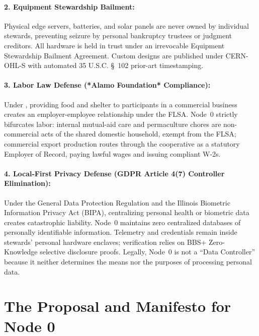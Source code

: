 \paragraph{2. Equipment Stewardship Bailment:} Physical edge servers, batteries, and solar panels are never owned by individual stewards, preventing seizure by personal bankruptcy trustees or judgment creditors. All hardware is held in trust under an irrevocable Equipment Stewardship Bailment Agreement. Custom designs are published under CERN-OHL-S with automated 35 U.S.C. \S~102 prior-art timestamping.

\paragraph{3. Labor Law Defense (*Alamo Foundation* Compliance):} Under \textcite{alamo1985}, providing food and shelter to participants in a commercial business creates an employer-employee relationship under the FLSA. Node~0 strictly bifurcates labor: internal mutual-aid care and permaculture chores are non-commercial acts of the shared domestic household, exempt from the FLSA; commercial export production routes through the cooperative as a statutory Employer of Record, paying lawful wages and issuing compliant W-2s.

\paragraph{4. Local-First Privacy Defense (GDPR Article 4(7) Controller Elimination):} Under the General Data Protection Regulation \parencite{gdpr2016} and the Illinois Biometric Information Privacy Act (BIPA), centralizing personal health or biometric data creates catastrophic liability. Node~0 maintains zero centralized databases of personally identifiable information. Telemetry and credentials remain inside stewards' personal hardware enclaves; verification relies on BBS+ Zero-Knowledge selective disclosure proofs. Legally, Node~0 is not a ``Data Controller'' because it neither determines the means nor the purposes of processing personal data.

\section{The Proposal and Manifesto for Node 0}
\label{sec:proposal_manifesto}

